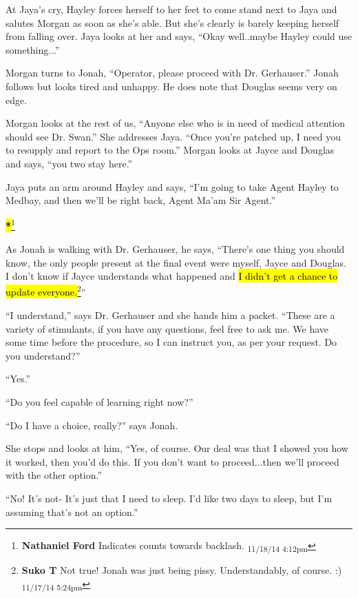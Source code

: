 At Jaya's cry, Hayley forces herself to her feet to come stand next to Jaya and salutes Morgan as soon as she's able.  But she's clearly is barely keeping herself from falling over.  Jaya looks at her and says, ``Okay well..maybe Hayley could use something...''

Morgan turns to Jonah, ``Operator, please proceed with Dr. Gerhauser.''  Jonah follows but looks tired and unhappy.  He does note that Douglas seems very on edge.



Morgan looks at the rest of us, ``Anyone else who is in need of medical attention should see Dr. Swan.''  She addresses Jaya.  ``Once you're patched up, I need you to resupply and report to the Ops room.''  Morgan looks at Jayce and Douglas and says, ``you two stay here.''



Jaya puts an arm around Hayley and says, ``I'm going to take Agent Hayley to Medbay, and then we'll be right back, Agent Ma'am Sir Agent.''




\textbf{\hl{*}}\footnote{\textbf{Nathaniel Ford }Indicates counts towards backlash. \textsubscript{11/18/14 4:12pm}}

As Jonah is walking with Dr. Gerhauser, he says, ``There's one thing you should know, the only people present at the final event were myself, Jayce and Douglas.  I don't know if Jayce understands what happened and \hl{I didn't get a chance to update everyone.}\footnote{\textbf{Suko T }Not true!  Jonah was just being pissy.  Understandably, of course. :) \textsubscript{11/17/14 5:24pm}}''

``I understand,'' says Dr. Gerhauser and she hands him a packet.  ``These are a variety of stimulants, if you have any questions, feel free to ask me.  We have some time before the procedure, so I can instruct you, as per your request.  Do you understand?''

``Yes.''

``Do you feel capable of learning right now?''

``Do I have a choice, really?'' says Jonah.

She stops and looks at him, ``Yes, of course.  Our deal was that I showed you how it worked, then you'd do this.  If you don't want to proceed...then we'll proceed with the other option.''

``No!  It's not- It's just that I need to sleep.  I'd like two days to sleep, but I'm assuming that's not an option.''

